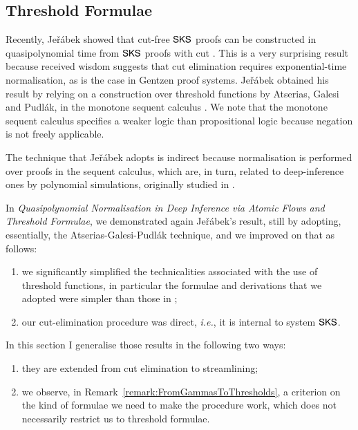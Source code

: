 \subsection{Threshold Formulae}\label{subsection:ThresholdFormulae}

Recently, Je\v r\'abek showed that cut-free $\mathsf{SKS}$ proofs can be constructed in quasipolynomial time from $\mathsf{SKS}$ proofs with cut \cite{Jera::On-the-C:kx}. This is a very surprising result because received wisdom suggests that cut elimination requires exponential-time normalisation, as is the case in Gentzen proof systems. Je\v r\'abek obtained his result by relying on a construction over threshold functions by Atserias, Galesi and Pudl\'ak, in the monotone sequent calculus \cite{AtseGalePudl:02:Monotone:yu}. We note that the monotone sequent calculus specifies a weaker logic than propositional logic because negation is not freely applicable.

The technique that Je\v r\'abek adopts is indirect because normalisation is performed over proofs in the sequent calculus, which are, in turn, related to deep-inference ones by polynomial simulations, originally studied in \cite{Brun:06:Deep-Inf:qy}.

In \emph{Quasipolynomial Normalisation in Deep Inference via Atomic Flows and Threshold Formulae}, we demonstrated again Je\v r\'abek's result, still by adopting, essentially, the Atserias-Galesi-Pudl\'ak technique, and we improved on that as follows:
\begin{enumerate}
\item we significantly simplified the technicalities associated with the use of threshold functions, in particular the formulae and derivations that we adopted were simpler than those in \cite{AtseGalePudl:02:Monotone:yu};
\item our cut-elimination procedure was direct, \emph{i.e.}, it is internal to system $\mathsf{SKS}$.
\end{enumerate}

In this section I generalise those results in the following two ways:
\begin{enumerate}
\item they are extended from cut elimination to streamlining;
\item we observe, in Remark~\vref{remark:FromGammasToThresholds}, a criterion on the kind of formulae we need to make the procedure work, which does not necessarily restrict us to threshold formulae.
\end{enumerate}

